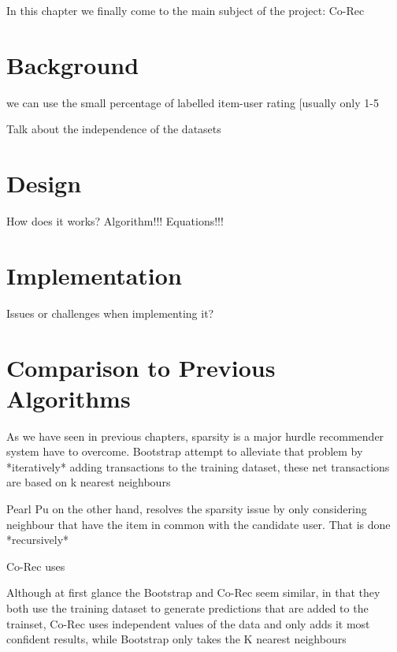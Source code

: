 In this chapter we finally come to the main subject of the project: Co-Rec

\section{Background}
we can use the small percentage of labelled item-user rating [usually only 1-5%

Talk about the independence of the datasets
\section{Design}
How does it works?
Algorithm!!!
Equations!!!

\section{Implementation}
Issues or challenges when implementing it?

\section{Comparison to Previous Algorithms}
As we have seen in previous chapters, sparsity is a major hurdle recommender system have to overcome. Bootstrap attempt to alleviate that problem by *iteratively* adding transactions to the training dataset, these net transactions are based on k nearest neighbours

Pearl Pu on the other hand, resolves the sparsity issue by only considering neighbour that have the item in common with the candidate user. That is done *recursively* 


Co-Rec uses 

Although at first glance the Bootstrap and Co-Rec seem similar, in that they both use the training dataset to generate predictions that are added to the trainset, Co-Rec uses independent values of the data and only adds it most confident results, while Bootstrap only takes the K nearest neighbours